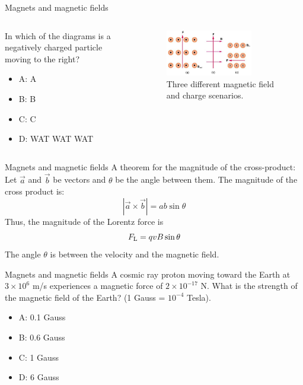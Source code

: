 \documentclass{beamer}
\begin{document}
\begin{frame}{Magnets and magnetic fields}
\begin{columns}[T]
\begin{column}{0.3\textwidth}
In which of the diagrams is a negatively charged particle moving to the right?
\begin{itemize}
\item A: A
\item B: B
\item C: C
\item D: WAT WAT WAT
\end{itemize}
\end{column}
\begin{column}{0.7\textwidth}
\begin{figure}
\centering
\includegraphics[width=0.75\textwidth]{figures/lorentzProblem.png}
\caption{\label{fig:lorentzProblem5} Three different magnetic field and charge scenarios.}
\end{figure}
\end{column}
\end{columns}
\end{frame}

\begin{frame}{Magnets and magnetic fields}
A theorem for the magnitude of the cross-product:  Let $\vec{a}$ and $\vec{b}$ be vectors and $\theta$ be the angle between them.  The magnitude of the cross product is:
\begin{equation}
|\vec{a} \times \vec{b}| =  a b \sin\theta
\end{equation}
Thus, the magnitude of the Lorentz force is
\begin{equation}
F_{\rm L} = q v B \sin\theta
\end{equation}
The angle $\theta$ is between the velocity and the magnetic field.
\end{frame}

\begin{frame}{Magnets and magnetic fields}
A cosmic ray proton moving toward the Earth at $3 \times 10^{6}$ m/s experiences a magnetic force of $2 \times 10^{-17}$ N. What is the strength of the magnetic field of the Earth? (1 Gauss = $10^{-4}$ Tesla).
\begin{itemize}
\item A: 0.1 Gauss
\item B: 0.6 Gauss
\item C: 1 Gauss
\item D: 6 Gauss
\end{itemize}
\end{frame}
\end{document}
